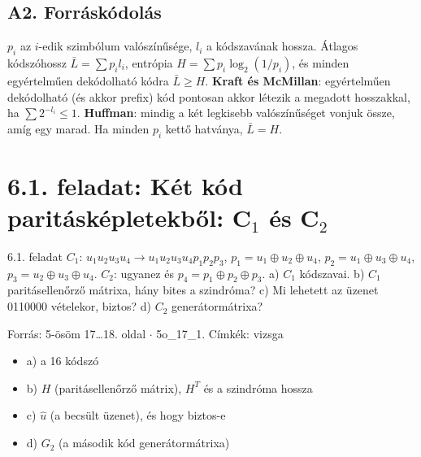 \subsection{\texorpdfstring{A2. Forráskódolás}{A2. Forráskódolás}}\label{b6-forras}
$p_i$ az $i$-edik szimbólum valószínűsége, $l_i$ a kódszavának hossza. Átlagos kódszóhossz $\bar L=\sum p_il_i$, entrópia $H=\sum p_i\log_2(1/p_i)$, és minden egyértelműen dekódolható kódra $\bar L\ge H$. \textbf{Kraft és McMillan}: egyértelműen dekódolható (és akkor prefix) kód pontosan akkor létezik a megadott hosszakkal, ha $\sum2^{-l_i}\le1$. \textbf{Huffman}: mindig a két legkisebb valószínűséget vonjuk össze, amíg egy marad. Ha minden $p_i$ kettő hatványa, $\bar L=H$.

\section{\texorpdfstring{6.1. feladat: Két kód paritásképletekből: C$_1$ és C$_2$}{6.1. feladat: Két kód paritásképletekből: C₁ és C₂}}\label{o6_01}
\setcounter{lepes}{0}
\begin{feladat}{6.1. feladat}
$C_1$: $u_1u_2u_3u_4\to u_1u_2u_3u_4p_1p_2p_3$, $p_1=u_1\oplus u_2\oplus u_4$, $p_2=u_1\oplus u_3\oplus u_4$, $p_3=u_2\oplus u_3\oplus u_4$. $C_2$: ugyanez és $p_4=p_1\oplus p_2\oplus p_3$. a) $C_1$ kódszavai. b) $C_1$ paritásellenőrző mátrixa, hány bites a szindróma? c) Mi lehetett az üzenet 0110000 vételekor, biztos? d) $C_2$ generátormátrixa?

{\footnotesize\sffamily Forrás: 5-ösöm 17\ldots{}18. oldal $\cdot$ 5o\_17\_1. Címkék: vizsga}
\end{feladat}
\begin{keresunk}
\begin{itemize}
\item a) a 16 kódszó
\item b) $H$ (paritásellenőrző mátrix), $H^T$ és a szindróma hossza
\item c) $\hat u$ (a becsült üzenet), és hogy biztos-e
\item d) $G_2$ (a második kód generátormátrixa)
\end{itemize}
\end{keresunk}
